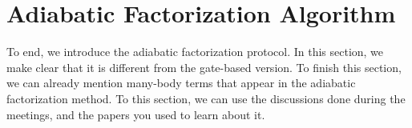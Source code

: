 \section{Adiabatic Factorization Algorithm}

To end, we introduce the adiabatic factorization protocol. In this section, we make clear that it is different from the gate-based version. To finish this section, we can already mention many-body terms that appear in the adiabatic factorization method. To this section, we can use the discussions done during the meetings, and the papers you used to learn about it.

\lipsum[1]